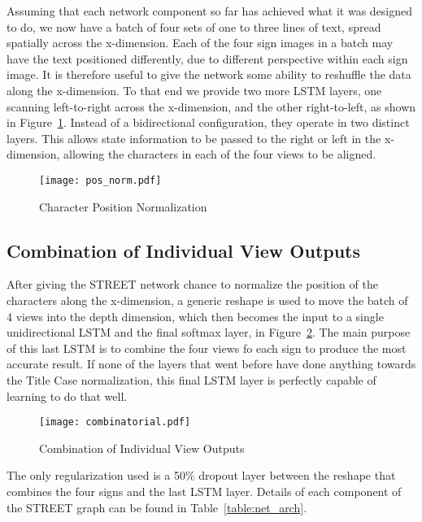\documentclass[runningheads]{llncs}
\begin{document}
Assuming that each network component so far has achieved what it was designed to do, we now have
a batch of four sets of
 one to three lines of text, spread spatially across the x-dimension. Each of the four sign images
 in a batch may have the text positioned differently, due to different perspective within each sign image.
 It is therefore useful to give the network some ability to reshuffle the data along the x-dimension.
 To that end we provide two more LSTM layers, one scanning left-to-right across the x-dimension,
 and the other right-to-left, as shown in Figure~\ref{fig:pos_norm}.
 Instead of a bidirectional configuration, they operate in two distinct layers.
This allows state information to be passed to the right or left in the x-dimension, allowing the characters
in each of the four views to be aligned.

\begin{figure}
\centering
\vspace{-6.5cm}
\texttt{[image: pos\_norm.pdf]}
\caption{Character Position Normalization}
\label{fig:pos_norm}
\end{figure}

\subsection{Combination of Individual View Outputs}
After giving the STREET network chance to normalize the position of the characters along the x-dimension,
 a generic reshape is used to move the batch of 4 views into the depth dimension, which then becomes
 the input to a single unidirectional LSTM and the final softmax layer,
 in Figure~\ref{fig:combinatorial}.
 The main purpose of this last LSTM is to combine the four views fo each sign to produce the most accurate
result. If none of the layers that went before have done anything towards the Title Case normalization,
 this final LSTM layer is perfectly capable of learning to do that well.

\begin{figure}
\centering
\vspace{-4.5cm}
\texttt{[image: combinatorial.pdf]}
\caption{Combination of Individual View Outputs}
\label{fig:combinatorial}
\end{figure}

The only regularization used is a 50\% dropout layer between the reshape that combines the four signs
 and the last LSTM layer. Details of each component of the STREET graph can be found in
 Table~\ref{table:net_arch}.
\end{document}
